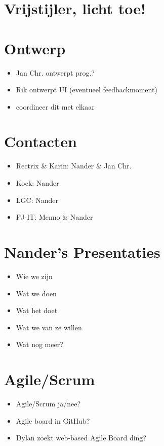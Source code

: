 \documentclass[a4paper, 10pt]{article}
\begin{document}
\section{Vrijstijler, licht toe!}

\section{Ontwerp}
\begin{itemize}
	\item Jan Chr. ontwerpt prog.?
	\item Rik ontwerpt UI (eventueel feedbackmoment)
	\item coordineer dit met elkaar
\end{itemize}

\section{Contacten}
\begin{itemize}
	\item Rectrix \& Karin: Nander \& Jan Chr.
	\item Koek: Nander
	\item LGC: Nander
	\item PJ-IT: Menno \& Nander
\end{itemize}

\section{Nander's Presentaties}
\begin{itemize}
	\item Wie we zijn
	\item Wat we doen
	\item Wat het doet
	\item Wat we van ze willen
	\item Wat nog meer?
\end{itemize}

\section{Agile/Scrum}
\begin{itemize}
	\item Agile/Scrum ja/nee?
	\item Agile board in GitHub?
	\item Dylan zoekt web-based Agile Board ding?
\end{itemize}
\end{document}
